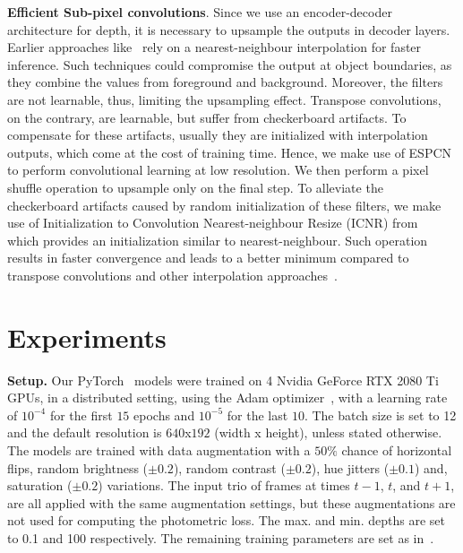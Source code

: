 \documentclass{bmvc2k}
\begin{document}
\textbf{Efficient Sub-pixel convolutions}. Since we use an encoder-decoder architecture for depth, it is necessary to upsample the outputs in decoder layers. Earlier approaches like~\cite{godard2019digging, zhou2017unsupervised, wang2018learning, yin2018geonet} rely on a nearest-neighbour interpolation for faster inference. Such techniques could compromise the output at object boundaries, as they combine the values from foreground and background. Moreover, the filters are not learnable, thus, limiting the upsampling effect. Transpose convolutions, on the contrary, are learnable, but suffer from checkerboard artifacts. To compensate for these artifacts, usually they are initialized with interpolation outputs, which come at the cost of training time. Hence, we make use of ESPCN~\cite{shi2016real} to perform convolutional learning at low resolution. We then perform a pixel shuffle operation to upsample only on the final step. To alleviate the checkerboard artifacts caused by random initialization of these filters, we make use of Initialization to Convolution Nearest-neighbour Resize (ICNR) from~\cite{aitken2017checkerboard} which provides an initialization similar to nearest-neighbour. Such operation results in faster convergence and leads to a better minimum compared to transpose convolutions and other interpolation approaches~\cite{shi2016real}.


\vspace{-13pt}
\section{Experiments}
\vspace{-5pt}
\label{sec:expts}
\textbf{Setup.} Our PyTorch~\cite{NEURIPS2019_9015} models were trained on 4 Nvidia GeForce RTX 2080 Ti GPUs, in a distributed setting, using the Adam optimizer~\cite{kingma2014adam}, with a learning rate of $10^{-4}$ for the first $15$ epochs and $10^{-5}$ for the last $10$. The batch size is set to 12 and the default resolution is $640$x$192$ (width x height), unless stated otherwise. The models are trained with data augmentation with a $50 \%$ chance of horizontal flips, random brightness ($\pm 0.2$), random contrast ($\pm 0.2$), hue jitters ($\pm 0.1$) and, saturation ($\pm 0.2$) variations. The input trio of frames at times $t-1$, $t$, and $t+1$, are all applied with the same augmentation settings, but these augmentations are not used for computing the photometric loss. The max. and min. depths are set to 0.1 and 100 respectively. The remaining training parameters are set as in~\cite{godard2019digging}.
\end{document}
